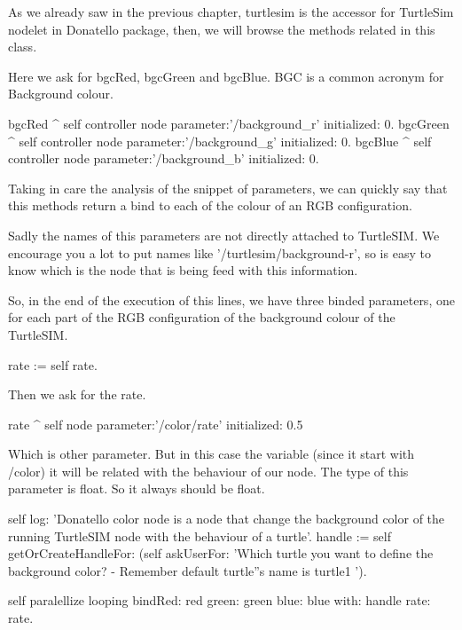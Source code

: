 \documentclass[a4paper,10pt,twoside]{book}
\begin{document}
		As we already saw in the previous chapter, turtlesim is the accessor for TurtleSim nodelet in Donatello package, then, we will browse the methods related in this class.
			
		Here we ask for bgcRed, bgcGreen and bgcBlue. BGC is a common acronym for Background colour. 
	
	
		\begin{code}
		
	bgcRed
	^ self controller node parameter:'/background_r' initialized: 0.
	bgcGreen
	^ self controller node parameter:'/background_g' initialized: 0.
	bgcBlue
	^ self controller node parameter:'/background_b' initialized: 0.
	
		\end{code}
		
		Taking in care the analysis of the snippet of parameters, we can quickly say that this methods return a bind to each of the colour of an RGB configuration.
		
		Sadly the names of this parameters are not directly attached to TurtleSIM. We encourage you a lot to put names like '/turtlesim/background-r', so is easy to know which is the node that is being feed with this information. 
		
		So, in the end of the execution of this lines, we have three binded parameters, one for each part of the RGB configuration of the background colour of the TurtleSIM.
		
		
		
		\begin{code}
	rate :=  self rate.

		\end{code}
		
		Then we ask for the rate. 
		
		\begin{code}
	rate
	^ self node parameter:'/color/rate' initialized: 0.5
		\end{code}
		
		Which is other parameter. But in this case the variable (since it start with /color) it will be related with the behaviour of our node. 
		The type of this parameter is float. So it always should be float. 
		
		
		\begin{code}
	self log: 'Donatello color node is a node that change the background color of the running TurtleSIM node with the behaviour of a turtle'.
	handle := self getOrCreateHandleFor: (self askUserFor: 'Which turtle you want to define the background color? - Remember default turtle''s name is turtle1 ').
	
	self paralellize looping 
					bindRed: red 
					green: green 
					blue: blue 
					with: handle 
					rate: rate.

		\end{code}
		
\end{document}
